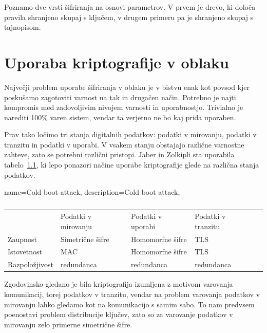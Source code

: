 \documentclass[12pt,a4paper,openany]{book}
\begin{document}
Poznamo dve vrsti šifriranja na osnovi parametrov. V prvem je drevo, ki določa pravila shranjeno skupaj s ključem, v drugem primeru pa je shranjeno skupaj s tajnopisom.

\chapter{Uporaba kriptografije v oblaku}

Največji problem uporabe šifriranja v oblaku je v bistvu enak kot povsod kjer poskušamo zagotoviti varnost na tak in drugačen način. Potrebno je najti kompromis med zadovoljivim nivojem varnosti in uporabnostjo. Trivialno je narediti 100\% varen sistem, vendar ta verjetno ne bo kaj prida uporaben.

Prav tako ločimo tri stanja digitalnih podatkov: podatki v mirovanju, podatki v tranzitu in podatki v uporabi. V vsakem stanju obstajajo različne varnostne zahteve, zato se potrebni različni pristopi. Jaber in Zolkipli\cite{jaber2013use} sta uporabila tabelo~\ref{tbl:cloudtriad}, ki lepo ponazori načine uporabe kriptografije glede na različna stanja podatkov.

{
  name=Cold boot attack,
  description={Cold boot attack},
}



\begin{table}[]
  \centering
  \begin{tabular}{lllll}
                                        & Podatki v mirovanju                   & Podatki v uporabi                    & Podatki v tranzitu              &  \\ \cline{2-4}
    \multicolumn{1}{l|}{Zaupnost}       & \multicolumn{1}{l|}{Simetrične šifre} & \multicolumn{1}{l|}{Homomorfne šifre} & \multicolumn{1}{l|}{TLS}        &  \\ \cline{2-4}
    \multicolumn{1}{l|}{Istovetnost}    & \multicolumn{1}{l|}{MAC}              & \multicolumn{1}{l|}{Homomorfne šifre} & \multicolumn{1}{l|}{TLS}        &  \\ \cline{2-4}
    \multicolumn{1}{l|}{Razpoložjivost} & \multicolumn{1}{l|}{redundanca}       & \multicolumn{1}{l|}{redundanca}       & \multicolumn{1}{l|}{redundanca} &  \\ \cline{2-4}
  \end{tabular}
  \caption{}
  \label{tbl:cloudtriad}
\end{table}

Zgodovinsko gledano je bila kriptografija izumljena z motivom varovanja komunikacij, torej podatkov v tranzitu, vendar na problem varovanja podatkov v mirovanju lahko gledamo kot na komunikacijo s samim sabo. To nam predvsem poenostavi problem distribucije ključev, zato so za varovanje podatkov v mirovanju zelo primerne simetrične šifre.
\end{document}
